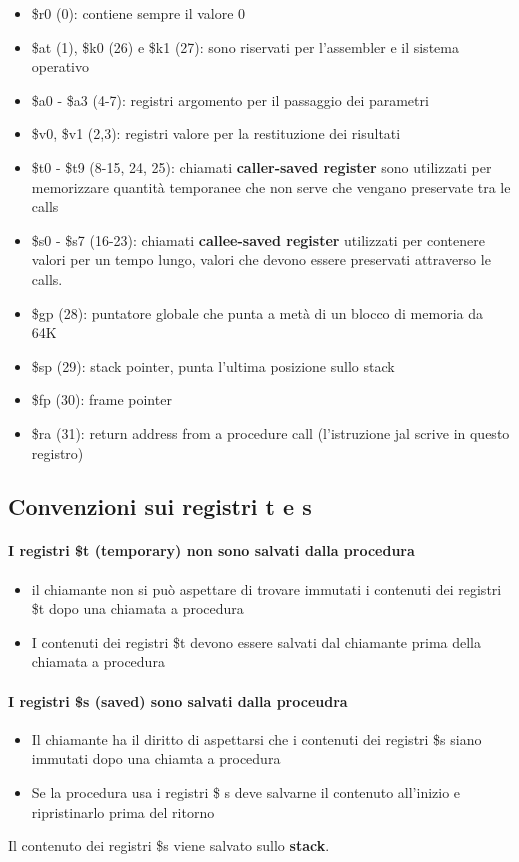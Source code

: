 \documentclass[12pt, a4paper, openany]{book}
\begin{document}
\begin{itemize}
    \item \$r0 (0): contiene sempre il valore 0
    \item \$at (1), \$k0 (26) e \$k1 (27): sono riservati per l'assembler e il sistema operativo
    \item \$a0 - \$a3 (4-7): registri argomento per il passaggio dei parametri
    \item \$v0, \$v1 (2,3): registri valore per la restituzione dei risultati
    \item \$t0 - \$t9 (8-15, 24, 25): chiamati \textbf{caller-saved register} sono utilizzati per memorizzare quantità temporanee
    che non serve che vengano preservate tra le calls
    \item \$s0 - \$s7 (16-23): chiamati \textbf{callee-saved register} utilizzati per contenere valori per un tempo lungo, valori
    che devono essere preservati attraverso le calls.
    \item \$gp (28): puntatore globale che punta a metà di un blocco di memoria da 64K 
    \item \$sp (29): stack pointer, punta l'ultima posizione sullo stack
    \item \$fp (30): frame pointer
    \item \$ra (31): return address from a procedure call (l'istruzione jal scrive in questo registro)
\end{itemize}
\subsection{Convenzioni sui registri t e s}
\paragraph{I registri \$t (temporary) non sono salvati dalla procedura} 
\begin{itemize}
    \item il chiamante non si può aspettare di trovare immutati i contenuti dei registri 
    \$t dopo una chiamata a procedura
    \item I contenuti dei registri \$t devono essere salvati dal chiamante prima della chiamata
    a procedura
\end{itemize}

\paragraph{I registri \$s (saved) sono salvati dalla proceudra}
\begin{itemize}
    \item Il chiamante ha il diritto di aspettarsi che i contenuti dei registri \$s siano
    immutati dopo una chiamta a procedura
    \item Se la procedura usa i registri \$ s deve salvarne il contenuto all'inizio e
    ripristinarlo prima del ritorno
\end{itemize}
Il contenuto dei registri \$s viene salvato sullo \textbf{stack}. 
\end{document}
